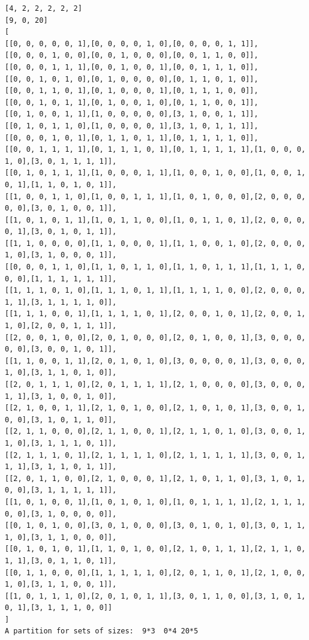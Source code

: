 \documentclass[final]{dmtcs-episciences}
\begin{document}
\begin{appendices}
\begin{verbatim} 
[4, 2, 2, 2, 2, 2]
[9, 0, 20]
[
[[0, 0, 0, 0, 0, 1],[0, 0, 0, 0, 1, 0],[0, 0, 0, 0, 1, 1]],
[[0, 0, 0, 1, 0, 0],[0, 0, 1, 0, 0, 0],[0, 0, 1, 1, 0, 0]],
[[0, 0, 0, 1, 1, 1],[0, 0, 1, 0, 0, 1],[0, 0, 1, 1, 1, 0]],
[[0, 0, 1, 0, 1, 0],[0, 1, 0, 0, 0, 0],[0, 1, 1, 0, 1, 0]],
[[0, 0, 1, 1, 0, 1],[0, 1, 0, 0, 0, 1],[0, 1, 1, 1, 0, 0]],
[[0, 0, 1, 0, 1, 1],[0, 1, 0, 0, 1, 0],[0, 1, 1, 0, 0, 1]],
[[0, 1, 0, 0, 1, 1],[1, 0, 0, 0, 0, 0],[3, 1, 0, 0, 1, 1]],
[[0, 1, 0, 1, 1, 0],[1, 0, 0, 0, 0, 1],[3, 1, 0, 1, 1, 1]],
[[0, 0, 0, 1, 0, 1],[0, 1, 1, 0, 1, 1],[0, 1, 1, 1, 1, 0]],
[[0, 0, 1, 1, 1, 1],[0, 1, 1, 1, 0, 1],[0, 1, 1, 1, 1, 1],[1, 0, 0, 0, 1, 0],[3, 0, 1, 1, 1, 1]],
[[0, 1, 0, 1, 1, 1],[1, 0, 0, 0, 1, 1],[1, 0, 0, 1, 0, 0],[1, 0, 0, 1, 0, 1],[1, 1, 0, 1, 0, 1]],
[[1, 0, 0, 1, 1, 0],[1, 0, 0, 1, 1, 1],[1, 0, 1, 0, 0, 0],[2, 0, 0, 0, 0, 0],[3, 0, 1, 0, 0, 1]],
[[1, 0, 1, 0, 1, 1],[1, 0, 1, 1, 0, 0],[1, 0, 1, 1, 0, 1],[2, 0, 0, 0, 0, 1],[3, 0, 1, 0, 1, 1]],
[[1, 1, 0, 0, 0, 0],[1, 1, 0, 0, 0, 1],[1, 1, 0, 0, 1, 0],[2, 0, 0, 0, 1, 0],[3, 1, 0, 0, 0, 1]],
[[0, 0, 0, 1, 1, 0],[1, 1, 0, 1, 1, 0],[1, 1, 0, 1, 1, 1],[1, 1, 1, 0, 0, 0],[1, 1, 1, 1, 1, 1]],
[[1, 1, 1, 0, 1, 0],[1, 1, 1, 0, 1, 1],[1, 1, 1, 1, 0, 0],[2, 0, 0, 0, 1, 1],[3, 1, 1, 1, 1, 0]],
[[1, 1, 1, 0, 0, 1],[1, 1, 1, 1, 0, 1],[2, 0, 0, 1, 0, 1],[2, 0, 0, 1, 1, 0],[2, 0, 0, 1, 1, 1]],
[[2, 0, 0, 1, 0, 0],[2, 0, 1, 0, 0, 0],[2, 0, 1, 0, 0, 1],[3, 0, 0, 0, 0, 0],[3, 0, 0, 1, 0, 1]],
[[1, 1, 0, 0, 1, 1],[2, 0, 1, 0, 1, 0],[3, 0, 0, 0, 0, 1],[3, 0, 0, 0, 1, 0],[3, 1, 1, 0, 1, 0]],
[[2, 0, 1, 1, 1, 0],[2, 0, 1, 1, 1, 1],[2, 1, 0, 0, 0, 0],[3, 0, 0, 0, 1, 1],[3, 1, 0, 0, 1, 0]],
[[2, 1, 0, 0, 1, 1],[2, 1, 0, 1, 0, 0],[2, 1, 0, 1, 0, 1],[3, 0, 0, 1, 0, 0],[3, 1, 0, 1, 1, 0]],
[[2, 1, 1, 0, 0, 0],[2, 1, 1, 0, 0, 1],[2, 1, 1, 0, 1, 0],[3, 0, 0, 1, 1, 0],[3, 1, 1, 1, 0, 1]],
[[2, 1, 1, 1, 0, 1],[2, 1, 1, 1, 1, 0],[2, 1, 1, 1, 1, 1],[3, 0, 0, 1, 1, 1],[3, 1, 1, 0, 1, 1]],
[[2, 0, 1, 1, 0, 0],[2, 1, 0, 0, 0, 1],[2, 1, 0, 1, 1, 0],[3, 1, 0, 1, 0, 0],[3, 1, 1, 1, 1, 1]],
[[1, 0, 1, 0, 0, 1],[1, 0, 1, 0, 1, 0],[1, 0, 1, 1, 1, 1],[2, 1, 1, 1, 0, 0],[3, 1, 0, 0, 0, 0]],
[[0, 1, 0, 1, 0, 0],[3, 0, 1, 0, 0, 0],[3, 0, 1, 0, 1, 0],[3, 0, 1, 1, 1, 0],[3, 1, 1, 0, 0, 0]],
[[0, 1, 0, 1, 0, 1],[1, 1, 0, 1, 0, 0],[2, 1, 0, 1, 1, 1],[2, 1, 1, 0, 1, 1],[3, 0, 1, 1, 0, 1]],
[[0, 1, 1, 0, 0, 0],[1, 1, 1, 1, 1, 0],[2, 0, 1, 1, 0, 1],[2, 1, 0, 0, 1, 0],[3, 1, 1, 0, 0, 1]],
[[1, 0, 1, 1, 1, 0],[2, 0, 1, 0, 1, 1],[3, 0, 1, 1, 0, 0],[3, 1, 0, 1, 0, 1],[3, 1, 1, 1, 0, 0]]
]
A partition for sets of sizes:  9*3  0*4 20*5
\end{verbatim}


\end{appendices}
\end{document}
